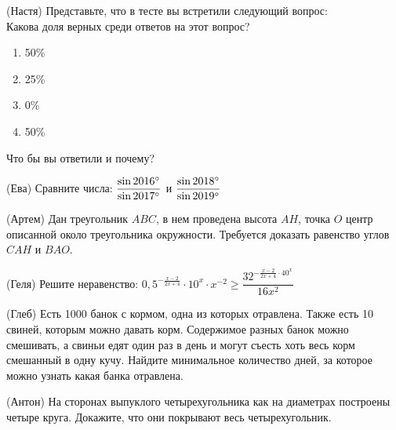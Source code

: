 \documentclass[12pt, a4paper]{article}
\begin{document}
	\begin{listofex}
		\item (Настя) Представьте, что в тесте вы встретили следующий вопрос:\\
		
		Какова доля верных среди ответов на этот вопрос?
		\begin{enumerate}
			\item 50\%
			\item 25\%
			\item 0\%
			\item 50\%
		\end{enumerate}
		Что бы вы ответили и почему?
		\item (Ева) Сравните числа: \( \dfrac{\sin2016\degree}{\sin2017\degree} \) и \( \dfrac{\sin2018\degree}{\sin2019\degree} \)
		\item (Артем) Дан треугольник \( ABC \), в нем проведена высота \( AH \), точка \( O \) центр описанной около треугольника окружности. Требуется доказать равенство углов \( CAH \) и \( BAO \).
		\item (Геля) Решите неравенство: \( 0,5^{-\frac{x-2}{2x+4}}\cdot10^x\cdot x^{-2}\ge\dfrac{32^{-\frac{x-2}{2x+4}\cdot40^x}}{16x^2} \)
		\item (Глеб) Есть 1000 банок с кормом, одна из которых отравлена. Также есть 10 свиней, которым можно давать корм. Содержимое разных банок можно смешивать, а свиньи едят один раз в день и могут съесть хоть весь корм смешанный в одну кучу. Найдите минимальное количество дней, за которое можно узнать какая банка отравлена.
		\item (Антон) На сторонах выпуклого четырехугольника как на диаметрах построены четыре круга. Докажите, что они покрывают весь четырехугольник.
	\end{listofex}
\end{document}
